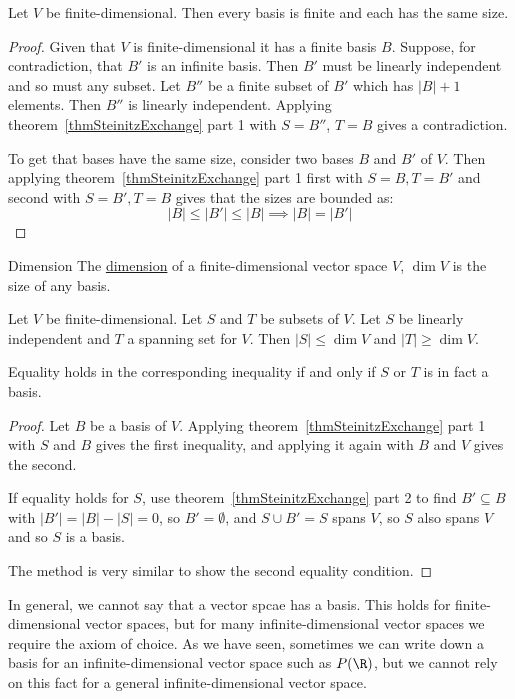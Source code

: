 \documentclass[../Main.tex]{subfiles}
\begin{document}
\begin{corollary}
    Let $V$ be finite-dimensional. Then every basis is finite and each has the same size.
    \label{corBasesSameSize}
\end{corollary}
\begin{proof}
    Given that $V$ is finite-dimensional it has a finite basis $B$. Suppose, for contradiction, that $B'$ is an infinite basis. Then $B'$ must be linearly independent and so must any subset. Let $B''$ be a finite subset of $B'$ which has $|B| + 1$ elements. Then $B''$ is linearly independent. Applying theorem~\ref{thmSteinitzExchange} part 1 with $S = B''$, $T = B$ gives a contradiction.

    To get that bases have the same size, consider two bases $B$ and $B'$ of $V$. Then applying theorem~\ref{thmSteinitzExchange} part 1 first with $S = B, T = B'$ and second with $S = B', T = B$ gives that the sizes are bounded as:
    \begin{equation*}
        |B| \leq |B'| \leq |B| \implies |B| = |B'|
    \end{equation*}
\end{proof}
\begin{definition}{Dimension}
    The \underline{dimension} of a finite-dimensional vector space $V$, $\dim{V}$ is the size of any basis.
\end{definition}
\begin{corollary}
    Let $V$ be finite-dimensional. Let $S$ and $T$ be subsets of $V$. Let $S$ be linearly independent and $T$ a spanning set for $V$. Then $|S| \leq \dim{V}$ and $|T| \geq \dim{V}$.

    Equality holds in the corresponding inequality if and only if $S$ or $T$ is in fact a basis.
    \label{corSpanLISizes}
\end{corollary}
\begin{proof}
    Let $B$ be a basis of $V$. Applying theorem~\ref{thmSteinitzExchange} part 1 with $S$ and $B$ gives the first inequality, and applying it again with $B$ and $V$ gives the second.

    If equality holds for $S$, use theorem~\ref{thmSteinitzExchange} part 2 to find $B' \subseteq B$ with $|B'| = |B| - |S| = 0$, so $B' = \emptyset$, and $S \cup B' = S$ spans $V$, so $S$ also spans $V$ and so $S$ is a basis.

    The method is very similar to show the second equality condition.
\end{proof}
\begin{remark}
    In general, we cannot say that a vector spcae has a basis. This holds for finite-dimensional vector spaces, but for many infinite-dimensional vector spaces we require the axiom of choice. As we have seen, sometimes we can write down a basis for an infinite-dimensional vector space such as $P(\R)$, but we cannot rely on this fact for a general infinite-dimensional vector space.
\end{remark}
\end{document}
